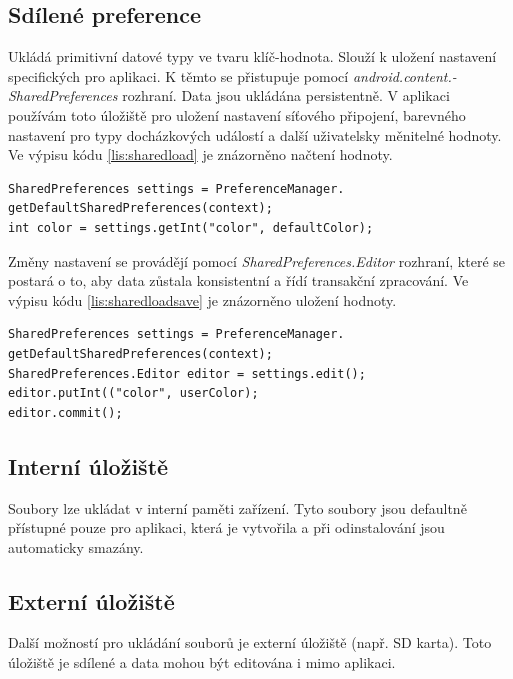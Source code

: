 \documentclass{diplomka}
\begin{document}
\subsection*{Sdílené preference} Ukládá primitivní datové typy ve tvaru klíč-hodnota. Slouží k uložení nastavení specifických pro aplikaci. K těmto se přistupuje pomocí \emph{android.content.-\\SharedPreferences} rozhraní. Data jsou ukládána persistentně. V aplikaci používám toto úložiště pro uložení nastavení síťového připojení, barevného nastavení pro typy docházkových událostí a další uživatelsky měnitelné hodnoty. Ve výpisu kódu \ref{lis:sharedload} je znázorněno načtení hodnoty.
\begin{lstlisting}[label=lis:sharedload, caption=Získání hodnoty nastavení]
SharedPreferences settings = PreferenceManager.
getDefaultSharedPreferences(context);
int color = settings.getInt("color", defaultColor);
\end{lstlisting}

\noindent
Změny nastavení se provádějí pomocí \emph{SharedPreferences.Editor} rozhraní, které se postará o to, aby data zůstala konsistentní a řídí transakční zpracování. Ve výpisu kódu \ref{lis:sharedloadsave} je znázorněno uložení hodnoty.\\
\begin{lstlisting}[label=lis:sharedloadsave, caption=Uložení hodnoty nastavení] 
SharedPreferences settings = PreferenceManager.
getDefaultSharedPreferences(context);
SharedPreferences.Editor editor = settings.edit();
editor.putInt(("color", userColor);
editor.commit();
\end{lstlisting}

\subsection*{Interní úložiště}
Soubory lze ukládat v interní paměti zařízení. Tyto soubory jsou defaultně přístupné pouze pro aplikaci, která je vytvořila a při odinstalování jsou automaticky smazány.
\subsection*{Externí úložiště}
Další možností pro ukládání souborů je externí úložiště (např. SD karta).  Toto úložiště je sdílené a data mohou být editována i mimo aplikaci.
\end{document}
